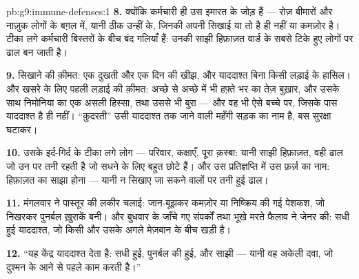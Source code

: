 \begin{solution}{pb:g9:immune-defenses:1}
\textbf{8.} क्योंकि कर्मचारी ही उस इमारत के जोड़ हैं --- रोज़ बीमारों और
नाज़ुक लोगों के बग़ल में, यानी ठीक उन्हीं के, जिनकी अपनी सिखाई या तो है
ही नहीं या कमज़ोर है। टीका लगे कर्मचारी बिस्तरों के बीच बंद गलियाँ हैं:
उनकी साझी हिफ़ाज़त वार्ड के सबसे टिके हुए लोगों पर ढाल बन जाती है।

\textbf{9.} सिखाने की क़ीमत: एक दुखती  और एक दिन की खीझ, और
याददाश्त बिना किसी लड़ाई के हासिल। और खसरे के लिए पहली लड़ाई की क़ीमत:
अच्छे से अच्छे में भी हफ़्ते भर का तेज़ बुख़ार, और उसके साथ निमोनिया का एक
असली हिस्सा, तथा उससे भी बुरा --- और वह भी ऐसे बच्चे पर, जिसके पास
याददाश्त है ही नहीं। ``क़ुदरती'' उसी याददाश्त तक जाने वाली महँगी सड़क का
नाम है, बस सुरक्षा घटाकर।

\textbf{10.} उसके इर्द-गिर्द के टीका लगे लोग --- परिवार, कक्षाएँ, पूरा
क़स्बा: यानी साझी हिफ़ाज़त, वही ढाल जो उन पर तनी रहती है जो सधने के लिए
बहुत छोटे हैं। और उस प्रतिज्ञप्ति में उस फ़र्ज़ का नाम: हिफ़ाज़त का साझा
होना --- यानी न सिखाए जा सकने वालों पर तनी हुई ढाल।

\textbf{11.} मंगलवार ने पास्तूर की लकीर चलाई: जान-बूझकर कमज़ोर या
निष्क्रिय की गई पेशकश, जो निखरकर पुनर्बल ख़ुराकें बनी। और बुधवार के जाँचे
गए संपर्कों तथा भूखे मरते फैलाव ने जेनर की: सधी हुई याददाश्त, जो किसी
 और उसके अगले मेज़बान के बीच खड़ी है।

\textbf{12.} ``यह केंद्र याददाश्त देता है: सधी हुई, पुनर्बल की हुई, और
साझी --- यानी वह अकेली दवा, जो दुश्मन के आने से पहले काम करती है।''
\end{solution}
